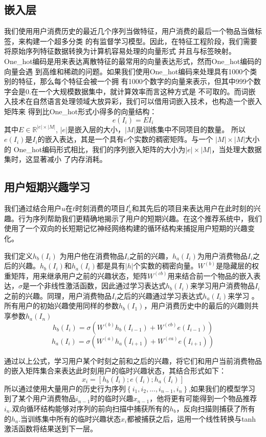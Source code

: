 \subsection{嵌入层}

我们使用用户消费历史的最近几个序列当做特征，用户消费的最后一个物品当做标签，来构建一个超多分类%
的有监督学习模型。因此，在特征工程阶段，我们需要将原始序列特征数据转换为计算机容易处理的向量形式%
并且与标签映射。One\_hot编码是用来表达离散特征的最常用的向量表达形式，然而One\_hot编码的向量会遇%
到高维和稀疏的问题。如果我们使用One\_hot编码来处理具有1000个类别的特征，那么每个特征会被一个拥%
有1000个数字的向量来表示，但其中999个数字会是0.在一个大规模数据集中，就计算效率而言这种方式是%
不可取的。而词嵌入技术在自然语言处理领域大放异彩，我们可以借用词嵌入技术，也构造一个嵌入矩阵来%
得到比One\_hot形式小得多的向量结构：
$$
e(I_i) = EI_i
$$
其中$E\in \mathbb{R}^{|e|\times |M|}$, $|e|$是嵌入层的大小，$|M|$是训练集中不同项目的数量。%
所以$e(I_i)$是$I_i$的嵌入表达，其是一个具有$e$个实数的稠密矩阵。与一个 $|M|\times |M|$大小的%
One\_hot编码形式相比，我们的序列嵌入矩阵的大小为$|e|\times |M|$，当处理大数据集时，这显著减小%
了内存消耗。

\subsection{用户短期兴趣学习}

我们通过结合用户$u$在$t$时刻消费的项目$I_{u}^{t}$和其先后的项目来表达用户在此时刻的兴趣。行为序列帮助我们更精确地揭示了用户的短期兴趣。在这个推荐系统中，我们使用了一个双向的长短期记忆神经网络构建的循环结构来捕捉用户短期的兴趣变化。

我们定义$h_{b}(I_{i})$ 为用户他在消费物品$I_i$之前的兴趣，$h_{a}(I_{i})$为用户消费物品$I_i$之后的兴趣。$h_{b}(I_{i})$和$h_{a}(I_{i})$都是具有$|h|$个实数的稠密向量。$W^{(b)}$是隐藏层的权重矩阵，用来继承用户之前的兴趣状态，矩阵$W^{(cb)}$用来结合前一个物品的嵌入表达，$\sigma$是一个非线性激活函数，因此通过学习表达式$h_{b}(I_{i})$来学习用户消费物品$I_i$之前的兴趣。同理，用户消费物品$I_i$之后的兴趣通过学习表达式$h_{a}(I_{i})$来学习
。所有用户的初始兴趣使用同样的参数$h_{b}(I_{1})$，用户消费历史中的最后的兴趣则共享参数$h_{a}(I_{n})$
$$
h_{b}(I_{i})=\sigma (W^{(b)}h_{b}(I_{i-1})+W^{(cb)}e(I_{i-1}))
$$
$$
h_{a}(I_{i})=\sigma (W^{(a)}h_{a}(I_{i+1})+W^{(ca)}e(I_{i+1}))
$$

通过以上公式，学习用户某个时刻之前和之后的兴趣，将它们和用户当前消费物品的嵌入矩阵集合来表达此时刻用户的临时兴趣状态，其结合形式如下：
$$
x_{i}=[h_{b}(I_{i});e(I_{i});h_{a}(I_{i})]
$$
所以通过使用大量用户的历史行为序列$\left \{ i_{1},i_{2},...,i_{n-1},i_{n} \right \}$,如果我们的模型学习到了某个用户消费物品$i_{n-1}$时的临时兴趣$x_{n-1}$，他将更有可能得到一个物品推荐$i_{n}$.双向循环结构能够对序列的前向扫描中捕获所有的$h_b$，反向扫描则捕获了所有的$h_a$.当训练集中所有的临时兴趣状态$x_i$都被捕获之后，运用一个线性转换与tanh激活函数将结果送到下一层。

